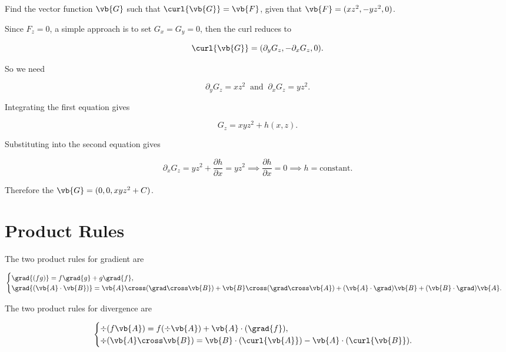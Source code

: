 \documentclass[english,a4paper,12pt]{report}
\begin{document}
{Find the vector function \(\vb{G} \) such that \(\curl{\vb{G} } = \vb{F} \), given that \(\vb{F} = (xz^2,-yz^2,0)\).  }
{Since \(F_{z}= 0 \), a simple approach is to set \(G_{x} = G_{y} =0  \), then the curl reduces to 

\begin{equation}
	\curl{\vb{G} } = (\partial _{y}G_{z} ,- \partial _{x}G_{z}, 0    ). 
\end{equation}

So we need 

\begin{equation}
	\partial _{y}G_{z} = xz^2 ~\text { and }~ \partial _{x}G_{z} = yz^2.    
\end{equation}

Integrating the first equation gives

\begin{equation}
	G_{z} = xyz^2 + h(x,z).  
\end{equation}

Substituting into the second equation gives 

\begin{equation}
	\partial _{x}G_{z} = yz^2 + \frac{\partial h}{\partial x} = yz^2 \implies \frac{\partial h}{\partial x} = 0 \implies h = \text{constant}.   
\end{equation}

Therefore the \(\vb{G} = (0,0,xyz^2 + C)\). 
} 

\section{Product Rules}
The two product rules for gradient are

\begin{equation}
\begin{cases} 
	\grad{(fg)} = f\grad{g} + g\grad{f},  \\
	\grad{(\vb{A} \cdot \vb{B})} = \vb{A} \cross (\grad \cross \vb{B}) + \vb{B} \cross (\grad \cross \vb{A}) + (\vb{A} \cdot \grad)\vb{B} + (\vb{B} \cdot \grad)\vb{A}. 
\end{cases}
\end{equation}
	
The two product rules for divergence are 

\begin{equation}
\begin{cases} 
	\div{(f\vb{A})} = f(\div{\vb{A}}) + \vb{A} \cdot (\grad{f}), \\
	\div (\vb{A} \cross \vb{B}) = \vb{B} \cdot (\curl {\vb{A}}) - \vb{A} \cdot (\curl{\vb{B}}). 
\end{cases}
\end{equation}
\end{document}
